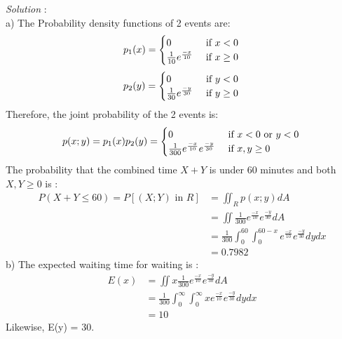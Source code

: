 \documentclass[a4paper]{article}
\begin{document}
\textit{Solution} : \\
a) The Probability density functions of 2 events are:
\begin{equation*}
	p_1(x)=\begin{cases} 0 &\text{ if } x < 0 \\ \frac{1}{10}e^{\frac{-x}{10}}& \text { if }x \geq 0\end{cases}\\
\end{equation*}
\begin{equation*}
	p_2(y)=\begin{cases} 0 &\text{ if } y < 0 \\ \frac{1}{30}e^{\frac{-y}{30}}& \text { if }y \geq 0\end{cases}\\
\end{equation*}
Therefore, the joint probability of the 2 events is:
\begin{equation*}
	p(x;y) = p_1(x)p_2(y) =\begin{cases}0 &\text{ if } x < 0 \text{ or } y < 0 \\ \frac{1}{300}e^{\frac{-x}{10}}e^{\frac{-y}{30}}& \text{ if }x,y \geq 0\end{cases}\\
\end{equation*}
The probability that the combined time $X+Y$ is under 60 minutes and both $X,Y \geq 0$ is :
\begin{align*} 
	P (X+Y \leq 60) = P[(X;Y) \text{ in }  R] & =\iint_R p(x;y) dA                                                               \\
	                                          & =  \iint\frac{1}{300}e^{\frac{-x}{10}}e^{\frac{-y}{30}} dA                       \\
	                                          & = \frac{1}{300}\int_{0}^{60}\int_0^{60-x}e^{\frac{-x}{10}}e^{\frac{-y}{30}} dydx \\&=0.7982  
\end{align*}
b) The expected waiting time for waiting is :
\begin{align*}
	E(x) & = \iint x\frac{1}{300}e^{\frac{-x}{10}}e^{\frac{-y}{30}} dA                         \\  
	     & =\frac{1}{300}\int_0^{\infty}\int_0^{\infty}xe^{\frac{-x}{10}}e^{\frac{-y}{30}}dydx \\
	\; & = 10 
\end{align*}
Likewise, E(y) = 30.
\newpage
\end{document}
